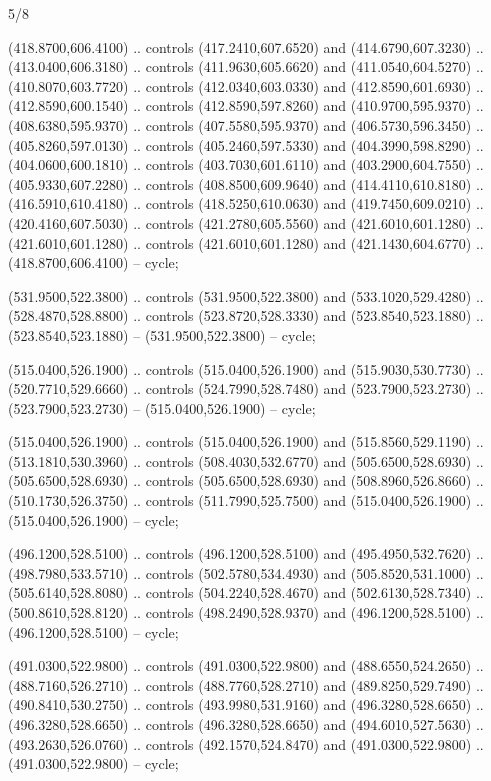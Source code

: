 \begin{flagdescription}{5/8}
\begin{scope}[shift={(m)}]
\begin{scope}[scale=\flagwidth/220,y=0.1mm, x=0.1mm, yscale=-1,shift={(-596,-360)}]
\begin{scope}[cm={{-1.0,0.0,0.0,1.0,(1193.9797,0.0)}}]
\begin{scope}[draw=black,line join=round,line cap=round,line width=0.381\lw]
\begin{scope}[line width=0.534\lw,fill=green]
 (418.8700,606.4100) .. controls (417.2410,607.6520) and
  (414.6790,607.3230) .. (413.0400,606.3180) .. controls (411.9630,605.6620) and
  (411.0540,604.5270) .. (410.8070,603.7720) .. controls (412.0340,603.0330) and
  (412.8590,601.6930) .. (412.8590,600.1540) .. controls (412.8590,597.8260) and
  (410.9700,595.9370) .. (408.6380,595.9370) .. controls (407.5580,595.9370) and
  (406.5730,596.3450) .. (405.8260,597.0130) .. controls (405.2460,597.5330) and
  (404.3990,598.8290) .. (404.0600,600.1810) .. controls (403.7030,601.6110) and
  (403.2900,604.7550) .. (405.9330,607.2280) .. controls (408.8500,609.9640) and
  (414.4110,610.8180) .. (416.5910,610.4180) .. controls (418.5250,610.0630) and
  (419.7450,609.0210) .. (420.4160,607.5030) .. controls (421.2780,605.5560) and
  (421.6010,601.1280) .. (421.6010,601.1280) .. controls (421.6010,601.1280) and
  (421.1430,604.6770) .. (418.8700,606.4100) -- cycle;

\end{scope}
\begin{scope}[fill=olive]
 (531.9500,522.3800) .. controls (531.9500,522.3800) and
  (533.1020,529.4280) .. (528.4870,528.8800) .. controls (523.8720,528.3330) and
  (523.8540,523.1880) .. (523.8540,523.1880) -- (531.9500,522.3800) -- cycle;

 (515.0400,526.1900) .. controls (515.0400,526.1900) and
  (515.9030,530.7730) .. (520.7710,529.6660) .. controls (524.7990,528.7480) and
  (523.7900,523.2730) .. (523.7900,523.2730) -- (515.0400,526.1900) -- cycle;

 (515.0400,526.1900) .. controls (515.0400,526.1900) and
  (515.8560,529.1190) .. (513.1810,530.3960) .. controls (508.4030,532.6770) and
  (505.6500,528.6930) .. (505.6500,528.6930) .. controls (505.6500,528.6930) and
  (508.8960,526.8660) .. (510.1730,526.3750) .. controls (511.7990,525.7500) and
  (515.0400,526.1900) .. (515.0400,526.1900) -- cycle;

 (496.1200,528.5100) .. controls (496.1200,528.5100) and
  (495.4950,532.7620) .. (498.7980,533.5710) .. controls (502.5780,534.4930) and
  (505.8520,531.1000) .. (505.6140,528.8080) .. controls (504.2240,528.4670) and
  (502.6130,528.7340) .. (500.8610,528.8120) .. controls (498.2490,528.9370) and
  (496.1200,528.5100) .. (496.1200,528.5100) -- cycle;

 (491.0300,522.9800) .. controls (491.0300,522.9800) and
  (488.6550,524.2650) .. (488.7160,526.2710) .. controls (488.7760,528.2710) and
  (489.8250,529.7490) .. (490.8410,530.2750) .. controls (493.9980,531.9160) and
  (496.3280,528.6650) .. (496.3280,528.6650) .. controls (496.3280,528.6650) and
  (494.6010,527.5630) .. (493.2630,526.0760) .. controls (492.1570,524.8470) and
  (491.0300,522.9800) .. (491.0300,522.9800) -- cycle;


\end{scope}
\end{scope}
\end{scope}
\end{scope}
\end{scope}
\end{flagdescription}
